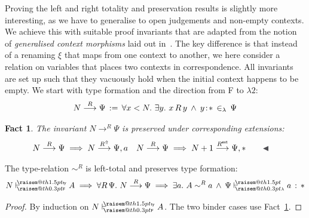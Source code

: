 \documentclass[a4paper,UKenglish]{lipics-v2016}
\makeatletter
\newcommand{\ms}{\,}
\newcommand{\mrel}[1]{\mathrel{\ms #1 \ms}}
\newcommand{\OF}{\mrel{:}}
\newcommand{\mAnd}{\mrel{\wedge}}
\newcommand{\mAll}[1]{\ensuremath{\forall} #1.\ms\ms}
\newcommand{\mEx}[1]{\ensuremath{\exists} #1.\ms\ms}
\newcommand{\eqdef}{\mrel{:=}}
\newcommand{\SysL}{$\lambda2$\xspace}
\newcommand{\ty}{\mathsf{ty}}
\newcommand{\of}{\ensuremath{\!:\!}}
\newcommand{\raisemath}[1]{\mathpalette{\raisem@th{#1}}}
\newcommand{\raisem@th}[3]{\raisebox{#1}{\ensuremath{#2#3}}}
\newcommand{\tsAnnot}[2]{\vdash\hspace{-.7em}^{\raisemath{1.5pt}{\scriptscriptstyle{#2}}}_{\raisemath{0.3pt}{\scriptscriptstyle{#1}}}} %
\newcommand{\tfF}{\tsAnnot{\mathsf{F}}{\ty}}  %
\newcommand{\istyF}[2]{\ensuremath{{#1} \mathrel{\tfF} #2}}
\newcommand{\tyL}{\tsAnnot{\lambda}{}} %
\newcommand{\typingL}[3]{\ensuremath{{#1} \mathrel{\tyL} #2 \OF #3}}
\newcommand{\inL}{\mrel{\in_{\lambda}}}
\newcommand{\tyr}{\mathrel{\sim}}
\newcommand{\Rext}[1]{\ensuremath{#1^{\mathsf{ext}}}}
\newcommand{\Rshift}[1]{\ensuremath{#1^{\Uparrow}}}
\newcommand{\tyctxrelFL}[3]{\ensuremath{#1\mathrel{\mathop{\longrightarrow}^{#2}\limits}#3}}
\newcommand{\Prp}{\ensuremath{\textrm{\textasteriskcentered}}}
\theoremstyle{plain}
\newtheorem{fact}[theorem]{Fact}
\makeatother
\begin{document}
Proving the left and right totality and preservation results is slightly more interesting, as we have to generalise to open judgements and non-empty contexts.
We achieve this with suitable proof invariants that are adapted from the notion of \emph{generalised context morphisms} laid out in~\cite{KaiserEtAl:2017:sysf_pts_equiv_coq}.
The key difference is that instead of a renaming $\xi$ that maps from one context to another, we here consider a relation on variables that places two contexts in correspondence.
All invariants are set up such that they vacuously hold when the initial context happens to be empty.
We start with type formation and the direction from F to \SysL:
\begin{align*}
  \tyctxrelFL{N}{R}{\Psi} \eqdef \mAll {x < N} \mEx y x\,R\,y \mAnd y \of \Prp \inL \Psi
\end{align*}
\begin{fact}
  \label{fac:inv-tyfl-ext}
  The invariant $\tyctxrelFL{N}{R}{\Psi}$ is preserved under corresponding extensions:
  \begin{align*}
    &\tyctxrelFL{N}{R}{\Psi} \implies \tyctxrelFL{N}{\Rshift{R}}{\Psi,a} & &\tyctxrelFL{N}{R}{\Psi} \implies \tyctxrelFL{N+1}{\Rext{R}}{\Psi,\Prp} \tag*{\qedsymbol}
  \end{align*}
\end{fact}
\begin{lemma}
  \label{lem:tyr_fl_tot_pres}
  The type-relation $\tyr^R$ is left-total and preserves type formation:
  \begin{align*}
    \istyF{N}{A} \implies \mAll {R\,\Psi} \tyctxrelFL{N}{R}{\Psi} \implies \mEx a A \tyr^R a \mAnd \typingL{\Psi}{a}{\Prp}
  \end{align*}
\end{lemma}
\begin{proof}
  By induction on $\istyF{N}{A}$. The two binder cases use Fact~\ref{fac:inv-tyfl-ext}.
\end{proof}
\end{document}
